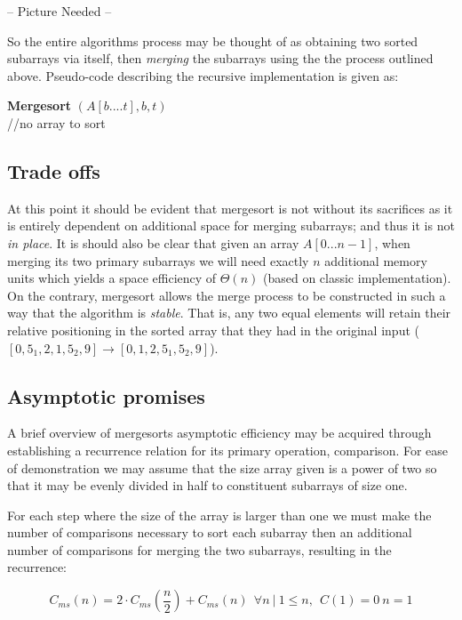 \documentclass[11pt,letterpaper]{report}
\begin{document}
-- Picture Needed --

So the entire algorithms process may be thought of as obtaining two sorted subarrays via itself, then \emph{merging} the subarrays using the the process outlined above. Pseudo-code describing the recursive implementation is given as:

\begin{algorithm}[H]
\textbf{Mergesort} $(A[b....t], b, t)$ \\
   {//no array to sort}
\end{algorithm}

\subsection*{Trade offs}
At this point it should be evident that mergesort is not without its sacrifices as it is entirely dependent on additional space for merging subarrays; and thus it is not \emph{in place}. It is should also be clear that given an array $A[0...n-1]$, when merging its two primary subarrays we will need exactly $n$ additional memory units which yields a space efficiency of $\Theta(n)$ (based on classic implementation). On the contrary, mergesort allows the merge process to be constructed in such a way that the algorithm is \emph{stable}. That is, any two equal elements will retain their relative positioning in the sorted array that they had in the original input ($[0,5_1,2,1,5_2,9] \rightarrow [0,1,2,5_1,5_2,9]$).

\subsection*{Asymptotic promises}
A brief overview of mergesorts asymptotic efficiency may be acquired through establishing a recurrence relation for its primary operation, comparison. For ease of demonstration we may assume that the size array given is a power of two so that it may be evenly divided in half to constituent subarrays of size one. 

For each step where the size of the array is larger than one we must make the number of comparisons necessary to sort each subarray then an additional number of comparisons for merging the two subarrays, resulting in the recurrence: 

\begin{equation} 
C_{ms}(n)=2 \cdot C_{ms}(\frac{n}{2})+C_{ms}(n) \ \ \forall n~ | \ 1 \leq n, \ \ C(1) = 0 \ n=1
\end{equation}
\end{document}
